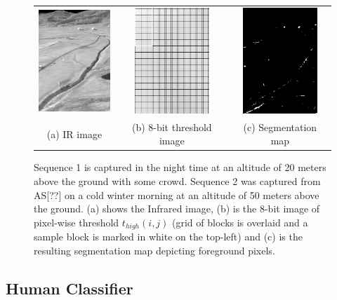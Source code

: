 \documentclass[runningheads]{llncs}
\begin{document}
\begin{figure}
  \begin{tabular}{ccc}
    \includegraphics[height=4cm]{img/bg_sub/Roth_Infrared_Image_screenshot.png} &
    \includegraphics[height=4cm]{img/bg_sub/Roth_Threshold_values(high)_screenshot.png} &
    \includegraphics[height=4cm]{img/bg_sub/Roth_Segmentation_Map_screenshot.png} \\
    \small (a) IR image & 
    \small (b) 8-bit threshold image &
    \small (c) Segmentation map
  \end{tabular}

  \caption{Sequence 1 is captured in the night time at an altitude of 20 meters above the ground with some crowd. Sequence 2 was captured from AS[??] on a cold winter morning at an altitude of 50 meters above the ground. (a) shows the Infrared image, (b) is the 8-bit image of pixel-wise threshold $t_{high}(i, j)$  (grid of blocks is overlaid and a sample block is marked in white on the top-left) and (c) is the resulting segmentation map depicting foreground pixels.}\label{fig:bg_sub}
\end{figure}


\subsection{Human Classifier}
\end{document}
